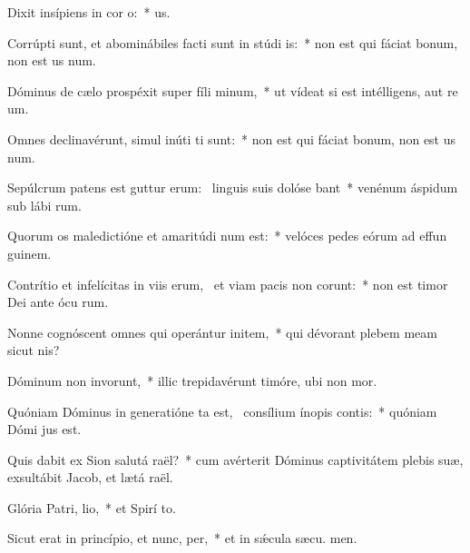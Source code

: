 \item Dixit insípiens in cor o:~*   us.
\item Corrúpti sunt, et abominábiles facti sunt in stúdi is:~* non est qui fáciat bonum, non est us  num.
\item Dóminus de cælo prospéxit super fíli minum,~* ut vídeat si est intélligens, aut re um.
\item Omnes declinavérunt, simul inúti ti sunt:~* non est qui fáciat bonum, non est us  num.
\item Sepúlcrum patens est guttur erum:~\pscross{} linguis suis dolóse bant~* venénum áspidum sub lábi rum.
\item Quorum os maledictióne et amaritúdi num est:~* velóces pedes eórum ad effun guinem.
\item Contrítio et infelícitas in viis erum,~\pscross{} et viam pacis non corunt:~* non est timor Dei ante ócu rum.
\item Nonne cognóscent omnes qui operántur initem,~* qui dévorant plebem meam sicut  nis?
\item Dóminum non invorunt,~* illic trepidavérunt timóre, ubi non  mor.
\item Quóniam Dóminus in generatióne ta est,~\pscross{} consílium ínopis contis:~* quóniam Dómi  jus est.
\item Quis dabit ex Sion salutá raël?~* cum avérterit Dóminus captivitátem plebis suæ, exsultábit Jacob, et lætá raël.
\item Glória Patri,  lio,~* et Spirí to.
\item Sicut erat in princípio, et nunc,  per,~* et in sǽcula sæcu. men.
